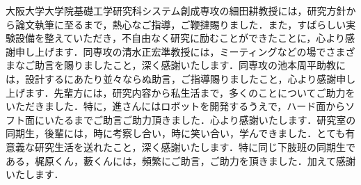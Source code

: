 大阪大学大学院基礎工学研究科システム創成専攻の細田耕教授には，研究方針から論文執筆に至るまで，熱心なご指導，ご鞭撻賜りました．また，すばらしい実験設備を整えていただき，不自由なく研究に励むことができたことに，心より感謝申し上げます．同専攻の清水正宏準教授には，ミーティングなどの場でさまざまなご助言を賜りましたこと，深く感謝いたします．同専攻の池本周平助教には，設計するにあたり並々ならぬ助言，ご指導賜りましたこと，心より感謝申し上げます．先輩方には，研究内容から私生活まで，多くのことについてご助力をいただきました．特に，進さんにはロボットを開発するうえで，ハード面からソフト面にいたるまでご助言ご助力頂きました．心より感謝いたします．研究室の同期生，後輩には，時に考察し合い，時に笑い合い，学んできました．とても有意義な研究生活を送れたこと，深く感謝いたします．特に同じ下肢班の同期生である，梶原くん，藪くんには，頻繁にご助言，ご助力を頂きました．加えて感謝いたします．